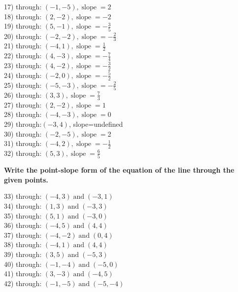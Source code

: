 \documentclass[12pt]{book}
\theoremstyle{definition}
\newcommand{\tmop}[1]{\ensuremath{\operatorname{#1}}}
\begin{document}
\begin{multicols}{2}
  17) through: $(- 1, - 5), \tmop{slope} = 2$\\
  18) through: $(2, - 2), \tmop{slope} = - 2$\\
  19) through: $(5, - 1), \tmop{slope} = - \frac{3}{5}$\\
  20) through: $(- 2, - 2), \tmop{slope} = - \frac{2}{3}$\\
  21) through: $(- 4, 1), \tmop{slope} = \frac{1}{2}$\\
  22) through: $(4, - 3), \tmop{slope} = - \frac{7}{4}$\\
  23) through: $(4, - 2), \tmop{slope} = - \frac{3}{2}$\\
  24) through: $(- 2, 0), \tmop{slope} = - \frac{5}{2}$\\
  25) through: $(- 5, - 3), \tmop{slope} = - \frac{2}{5}$\\
  26) through: $(3, 3), \tmop{slope} = \frac{7}{3}$\\
  27) through: $(2, - 2), \tmop{slope} = 1$\\
  28) through: $(- 4, - 3), \tmop{slope} =$0\\
  29) through:$(- 3, 4)$, slope=undefined\\
  30) through: $(- 2, - 5), \tmop{slope} =$2\\
  31) through: $(- 4, 2), \tmop{slope} = - \frac{1}{2}$\\
  32) through: $(5, 3), \tmop{slope} = \frac{6}{5}$
\end{multicols}
{\bf Write the point-slope form of the equation of the line through the given points.}
\begin{multicols}{2}
  33) through: $(- 4, 3) \tmop{and} (- 3, 1)$\\
  34) through: $(1, 3) \tmop{and} (- 3, 3)$\\
  35) through: $(5, 1) \tmop{and} (- 3, 0)$\\
  36) through: $(- 4, 5) \tmop{and} (4, 4)$\\
  37) through: $(- 4, - 2) \tmop{and} (0, 4)$\\
  38) through: $(- 4, 1) \tmop{and} (4, 4)$\\
  39) through: $(3, 5) \tmop{and} (- 5, 3)$\\
  40) through: $(- 1, - 4) \tmop{and} (- 5, 0)$\\
  41) through: $(3, - 3) \tmop{and} (- 4, 5)$\\
  42) through: $(- 1, - 5) \tmop{and} (- 5, - 4)$
\end{multicols}
\end{document}
